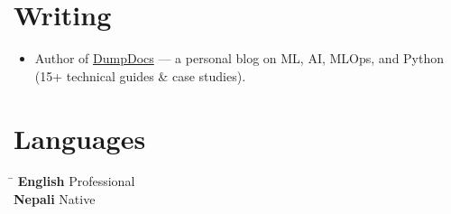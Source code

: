 \documentclass[a4paper,10pt]{article}
\begin{document}
\section{Writing}
\begin{itemize}
  \item Author of \href{https://shekharkoirala.github.io}{DumpDocs} --- a personal blog on ML, AI, MLOps, and Python (15+ technical guides \& case studies).
\end{itemize}

\section{Languages}
\begin{tabbing}
\hspace{2.4cm}\=\kill
\textbf{English} \> Professional \\
\textbf{Nepali} \> Native \\
\end{tabbing}
\end{document}

